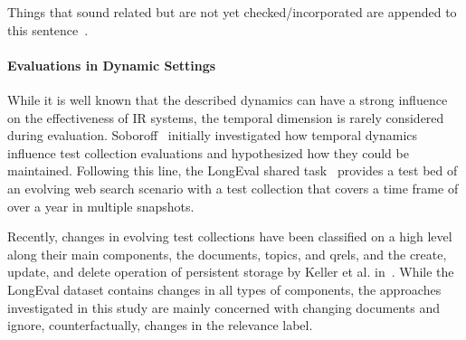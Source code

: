 Things that sound related but are not yet checked/incorporated are appended to this sentence~\cite{li:2022}.

\paragraph{Evaluations in Dynamic Settings}
While it is well known that the described dynamics can have a strong influence on the effectiveness of IR systems, the temporal dimension is rarely considered during evaluation. Soboroff~\cite{DBLP:conf/sigir/Soboroff06} initially investigated how temporal dynamics influence test collection evaluations and hypothesized how they could be maintained. Following this line, the LongEval shared task~\cite{DBLP:conf/clef/AlkhalifaBDEAFG24,DBLP:conf/clef/AlkhalifaBBCDEA23} provides a test bed of an evolving web search scenario with a test collection that covers a time frame of over a year in multiple snapshots.

Recently, changes in evolving test collections have been classified on a high level along their main components, the documents, topics, and qrels, and the create, update, and delete operation of persistent storage by Keller et al. in~\cite{keller:2024}. While the LongEval dataset contains changes in all types of components, the approaches investigated in this study are mainly concerned with changing documents and ignore, counterfactually, changes in the relevance label.
